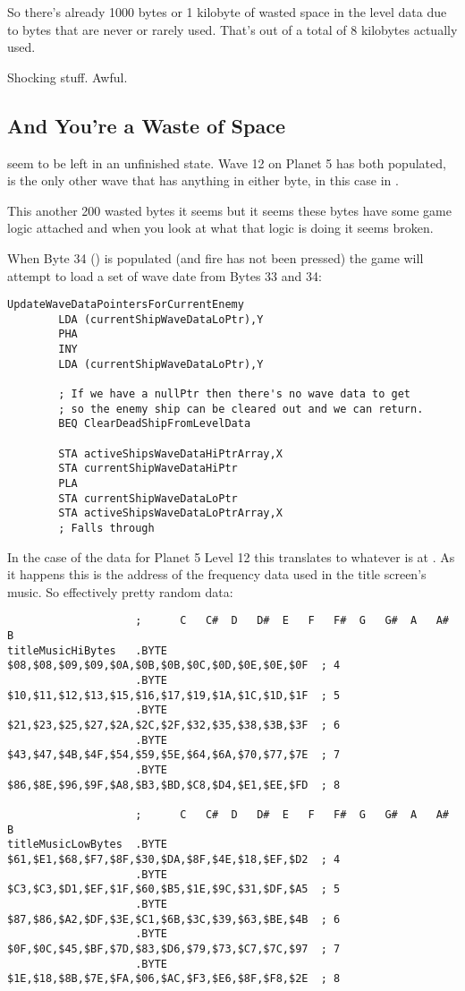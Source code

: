 So there's already 1000 bytes or 1 kilobyte of wasted space in the level data due to bytes
that are never or rarely used. That's out of a total of 8 kilobytes actually used.

Shocking stuff. Awful.

\subsection{And You're a Waste of Space}

 seem to be left in an unfinished state. Wave 12 on Planet 5 has both populated, 
is the only other wave that has anything in either byte, in this case  in .

This another 200 wasted bytes it seems but it seems these bytes have some game logic attached and
when you look at what that logic is doing it seems broken.


When Byte 34 () is populated (and fire has not been pressed) the game will attempt to load
a set of wave date from Bytes 33 and 34:

\begin{lstlisting}
UpdateWaveDataPointersForCurrentEnemy
        LDA (currentShipWaveDataLoPtr),Y
        PHA
        INY
        LDA (currentShipWaveDataLoPtr),Y

        ; If we have a nullPtr then there's no wave data to get
        ; so the enemy ship can be cleared out and we can return.
        BEQ ClearDeadShipFromLevelData

        STA activeShipsWaveDataHiPtrArray,X
        STA currentShipWaveDataHiPtr
        PLA
        STA currentShipWaveDataLoPtr
        STA activeShipsWaveDataLoPtrArray,X
        ; Falls through
\end{lstlisting}

In the case of the data for Planet 5 Level 12 this translates to whatever is at . As it happens this 
is the address of the frequency data used in the title screen's music. So effectively pretty random data:

\begin{lstlisting}
                    ;      C   C#  D   D#  E   F   F#  G   G#  A   A#  B
titleMusicHiBytes   .BYTE $08,$08,$09,$09,$0A,$0B,$0B,$0C,$0D,$0E,$0E,$0F  ; 4
                    .BYTE $10,$11,$12,$13,$15,$16,$17,$19,$1A,$1C,$1D,$1F  ; 5
                    .BYTE $21,$23,$25,$27,$2A,$2C,$2F,$32,$35,$38,$3B,$3F  ; 6
                    .BYTE $43,$47,$4B,$4F,$54,$59,$5E,$64,$6A,$70,$77,$7E  ; 7
                    .BYTE $86,$8E,$96,$9F,$A8,$B3,$BD,$C8,$D4,$E1,$EE,$FD  ; 8

                    ;      C   C#  D   D#  E   F   F#  G   G#  A   A#  B
titleMusicLowBytes  .BYTE $61,$E1,$68,$F7,$8F,$30,$DA,$8F,$4E,$18,$EF,$D2  ; 4
                    .BYTE $C3,$C3,$D1,$EF,$1F,$60,$B5,$1E,$9C,$31,$DF,$A5  ; 5
                    .BYTE $87,$86,$A2,$DF,$3E,$C1,$6B,$3C,$39,$63,$BE,$4B  ; 6
                    .BYTE $0F,$0C,$45,$BF,$7D,$83,$D6,$79,$73,$C7,$7C,$97  ; 7
                    .BYTE $1E,$18,$8B,$7E,$FA,$06,$AC,$F3,$E6,$8F,$F8,$2E  ; 8
\end{lstlisting}

